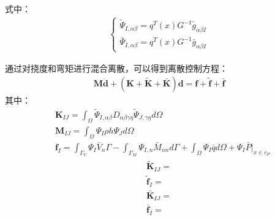 \documentclass[a4paper]{article}
\begin{document}
式中：
\begin{equation}
\begin{split}
\begin{cases}
    \tilde{\Psi}_{I,\alpha\beta}=q^T(x)G^{-1}\tilde{g}_{\alpha\beta I}\\
    \bar{\Psi}_{I,\alpha\beta}=q^T(x)G^{-1}\bar{g}_{\alpha\beta I}
\end{cases}
\end{split}
\end{equation}\par
通过对挠度和弯矩进行混合离散，可以得到离散控制方程：
\begin{equation}
\begin{split}
    \pmb{M}\ddot{\pmb d}+(\pmb{K}+\pmb{\tilde{K}}+\pmb{\bar{K}})\pmb{d}=\pmb{f}+\pmb{\tilde{f}}+\pmb{\bar f}
\end{split}
\end{equation}
其中：
\begin{equation}
\begin{split}
    &\pmb{K}_{I\!J}=\int_{\Omega}\tilde{\Psi}_{I,\alpha\beta}D_{\alpha\beta\gamma\eta}\tilde{\Psi}_{J,\gamma\eta}d\Omega\\
    &\pmb{M}_{I\!J}=\int_{\Omega}\Psi_I\rho h\Psi_Jd\Omega\\
    &\pmb{f}_I=\int_{\Gamma_V}\Psi_I\bar{V}_n\Gamma-\int_{\Gamma_M}\Psi_{I,n}\bar{M}_{nn}d\Gamma+\int_{\Omega}\Psi_I\bar{q}d\Omega+\Psi_I\bar{P}\vert_{x\in c_P}
\end{split}
\end{equation}
\begin{equation}
\begin{split}
   \pmb{\tilde{K}}_{I\!J}=\\
   \pmb{\tilde{f}}_I= 
\end{split}
\end{equation}
\begin{equation}
\begin{split}
     \pmb{\bar{K}}_{I\!J}=\\
     \pmb{\bar{f}}_I=
\end{split}
\end{equation}
\end{document}
